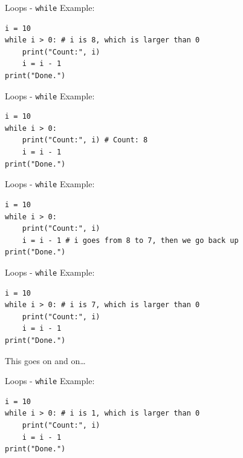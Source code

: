 \documentclass[dvipsnames, svgnames, x11names, handout]{beamer}
\begin{document}
\addtocounter{framenumber}{-1}

\begin{frame}[fragile]{Loops - \texttt{while}}
Example:
\begin{verbatim}
i = 10
while i > 0: # i is 8, which is larger than 0
    print("Count:", i)
    i = i - 1
print("Done.")
\end{verbatim}
\end{frame}

\addtocounter{framenumber}{-1}

\begin{frame}[fragile]{Loops - \texttt{while}}
Example:
\begin{verbatim}
i = 10
while i > 0: 
    print("Count:", i) # Count: 8
    i = i - 1
print("Done.")
\end{verbatim}
\end{frame}

\addtocounter{framenumber}{-1}

\begin{frame}[fragile]{Loops - \texttt{while}}
Example:
\begin{verbatim}
i = 10
while i > 0: 
    print("Count:", i)
    i = i - 1 # i goes from 8 to 7, then we go back up
print("Done.")
\end{verbatim}
\end{frame}

\addtocounter{framenumber}{-1}

\begin{frame}[fragile]{Loops - \texttt{while}}
Example:
\begin{verbatim}
i = 10
while i > 0: # i is 7, which is larger than 0
    print("Count:", i)
    i = i - 1
print("Done.")
\end{verbatim}

This goes on and on\dots
\end{frame}

\addtocounter{framenumber}{-1}

\begin{frame}[fragile]{Loops - \texttt{while}}
Example:
\begin{verbatim}
i = 10
while i > 0: # i is 1, which is larger than 0
    print("Count:", i)
    i = i - 1
print("Done.")
\end{verbatim}
\end{frame}
\end{document}
